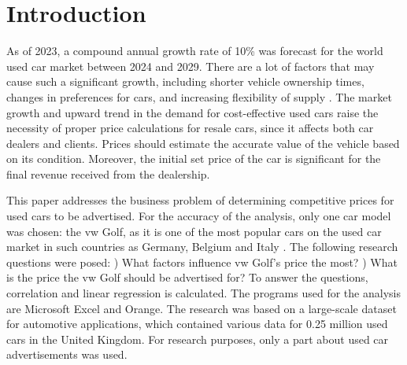 \chapter{Introduction}
As of 2023, a compound annual growth rate of 10\% was forecast for the world used car market between 2024 and 2029. There are a lot of factors that may cause such a significant growth, including shorter vehicle ownership times, changes in preferences for cars, and increasing flexibility of supply
\autocite{UsedCarMarket}.
The market growth and upward trend in the demand for cost-effective used cars 
\autocite{EuropeUsedCar} 
raise the necessity of proper price calculations for resale cars, since it affects both car dealers and clients. Prices should estimate the accurate value of the vehicle based on its condition. Moreover, the initial set price of the car is significant for the final revenue received from the dealership.
 
This paper addresses the business problem of determining competitive prices for used cars to be advertised. For the accuracy of the analysis, only one car model was chosen: the \ac{vw} Golf, as it is one of the most popular cars on the used car market in such countries as Germany, Belgium and Italy 
\autocite{misselhornDevelopmentUsedCar2024}.
The following research questions were posed: 
) What factors influence \ac{vw} Golf's price the most? ) What is the price the \ac{vw} Golf should be advertised for? \newline
To answer the questions, correlation and linear regression is calculated. The programs used for the analysis are Microsoft Excel and Orange.
The research was based on a large-scale dataset for automotive applications, which contained various data for 0.25 million used cars in the United Kingdom. For research purposes, only a part about used car advertisements was used.


